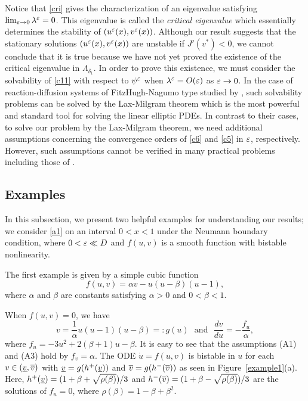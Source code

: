 \documentclass[a4,10pt]{article}
\begin{document}
\begin{remark}\label{rem3y}
Notice that \eqref{cri} gives the characterization of an eigenvalue satisfying 
$\lim_{\varepsilon \to 0} \lambda^\varepsilon = 0$. This eigenvalue is called the {\it critical eigenvalue}
which essentially determines the stability of $(u^\varepsilon(x), v^\varepsilon(x))$.
Although our result suggests that the stationary solutions $(u^\varepsilon(x), v^\varepsilon(x))$ are unstable if $J'(v^*) < 0$, we cannot conclude that it is true
because we have not yet proved the existence of the critical eigenvalue in $\Lambda_{\delta_1}$.
In order to prove this existence, 
we must consider the solvability of \eqref{c11} 
with respect to $\psi^\varepsilon$ 
when $\lambda^\varepsilon = O(\varepsilon)$ as $\varepsilon \to 0$.
In the case of reaction-diffusion systems of FitzHugh-Nagumo type studied 
by \cite{HS,NF}, such solvability problems can be solved by 
the Lax-Milgram theorem \cite{NS} which is the most powerful and
standard tool for 
solving the linear elliptic PDEs.  
In contrast to their cases, to solve
our problem by the Lax-Milgram theorem, we need 
additional assumptions concerning 
the convergence orders of 
\eqref{c6} and \eqref{c5} in $\varepsilon$, respectively.
However, such assumptions cannot be verified in many practical problems
including those of \cite{MJE1, MJE2}.
\end{remark}

\subsection{Examples}

In this subsection, we present two helpful examples for understanding our results;
we consider \eqref{a1} on an interval $0 < x < 1$ under the Neumann boundary condition,
where $0 < \varepsilon \ll D$ and $f(u,v)$ is a smooth function with bistable nonlinearity.  

\begin{example} \rm

The first example is given by a simple cubic function
%
\begin{equation}\label{cubic}
f(u, v) = \alpha v - u(u-\beta)(u-1),
\end{equation}
%
where $\alpha$ and $\beta$ are constants satisfying $\alpha >0$ and $0 < \beta < 1$. 
\end{example}

When $f(u, v) = 0$, we have
%
\[
v = \frac{1}{\alpha}u(u-1)(u-\beta) =:g(u)
\ \ \
\text{and}
\ \ \ 
\frac{dv}{du} = - \frac{f_u}{\alpha},
\]
%
where $f_u = -3u^2 + 2(\beta+1)u - \beta$. It is easy to see that the assumptions (A1) and (A3) hold by  $f_v = \alpha$. The ODE $\dot{u} = f(u,v)$ is bistable in $u$ for each 
$v \in (\underline{v}, {\overline{v}})$ with $\underline{v} = g(h^+(\underline{v}))$ and $\overline{v} = g(h^-(\overline{v}))$
as seen in Figure~\ref{example1}(a). Here, $h^+(\underline{v}) = (1 + \beta + \sqrt{\rho(\beta)})/3$
and $h^-(\overline{v}) = (1 + \beta - \sqrt{\rho(\beta)})/3$
are the solutions of $f_u=0$, where $\rho(\beta) = 1 - \beta + \beta^2$.
%
\end{document}

